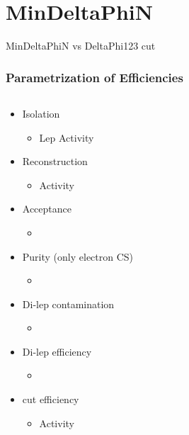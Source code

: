 \documentclass{beamer}
\begin{document}
\section{MinDeltaPhiN}
\begin{frame}
  \begin{center}
    {\Large MinDeltaPhiN vs DeltaPhi123 cut}
  \end{center}
\end{frame}

\begin{frame}
\frametitle{Parametrization of Efficiencies}
  \begin{columns}
    \begin{column}{0.5\textwidth}
     \centering
     \deltaphi 
             \begin{itemize}


        \item Isolation
   \begin{itemize}
    \item Lep \pt Activity
   \end{itemize}
   \item Reconstruction
   \begin{itemize}
    \item Activity
   \end{itemize}
   \item Acceptance
   \begin{itemize}
    \item \BTags \NJets
   \end{itemize}
   \item Purity (only electron CS)
   \begin{itemize}
    \item \MHT \NJets
   \end{itemize}
      \item Di-lep contamination
   \begin{itemize}
    \item \NJets
   \end{itemize}
   \item Di-lep efficiency
   \begin{itemize}
    \item \NJets
   \end{itemize}
   \item \mt cut efficiency
   \begin{itemize}
    \item Activity
   \end{itemize}
     \end{itemize}
    \end{column}
    \begin{column}{0.5\textwidth}
      \centering
      \mindeltaphi
                   \begin{itemize}



\end{itemize}
\end{column}
\end{columns}
\end{frame}
\end{document}
